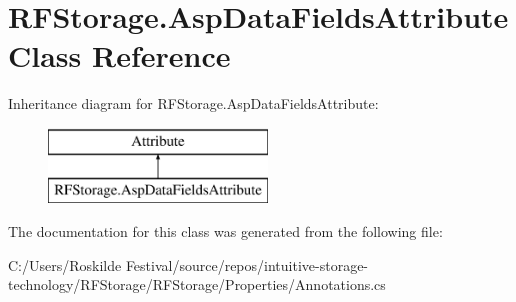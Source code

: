 \section{R\+F\+Storage.\+Asp\+Data\+Fields\+Attribute Class Reference}
\label{class_r_f_storage_1_1_asp_data_fields_attribute}
Inheritance diagram for R\+F\+Storage.\+Asp\+Data\+Fields\+Attribute\+:\begin{figure}[H]
\begin{center}
\leavevmode
\includegraphics[height=2.000000cm]{class_r_f_storage_1_1_asp_data_fields_attribute}
\end{center}
\end{figure}


The documentation for this class was generated from the following file\+:\begin{DoxyCompactItemize}
\item 
C\+:/\+Users/\+Roskilde Festival/source/repos/intuitive-\/storage-\/technology/\+R\+F\+Storage/\+R\+F\+Storage/\+Properties/Annotations.\+cs\end{DoxyCompactItemize}
